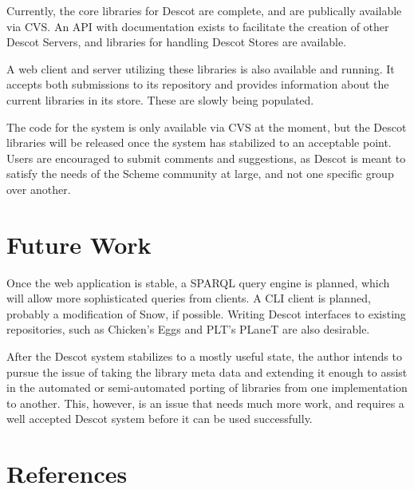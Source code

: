 Currently, the core libraries for Descot are complete, and are 
publically available via CVS. An API with documentation exists 
to facilitate the creation of other Descot Servers, and libraries 
for handling Descot Stores are available. 

A web client and server utilizing these libraries is also available
and running. It accepts both submissions to its repository and
provides information about the current libraries in its store. These
are slowly being populated.

The code for the system is only available via CVS at the moment, 
but the Descot libraries will be released once the system has 
stabilized to an acceptable point. Users are encouraged to 
submit comments and suggestions, as Descot is meant to 
satisfy the needs of the Scheme community at large, and not one 
specific group over another. 

\section{Future Work}

Once the web application is stable, a SPARQL query engine is 
planned, which will allow more sophisticated queries from clients. 
A CLI client is planned, probably a modification of Snow, if 
possible. Writing Descot interfaces to existing repositories, such 
as Chicken's Eggs and PLT's PLaneT are also desirable. 

After the Descot system stabilizes to a mostly useful state, 
the author intends to pursue the issue of taking the library 
meta data and extending it enough to assist in the automated 
or semi-automated porting of libraries from one implementation 
to another. This, however, is an issue that needs much more 
work, and requires a well accepted Descot system before it 
can be used successfully.

\section{References}




\bye
